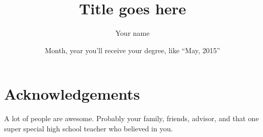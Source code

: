 \documentclass[letterpaper,11pt]{yalephd}
\title{Title goes here}
\author{Your name}
\date{Month, year you'll receive your degree, like ``May, 2015''} %
\begin{document}
\frontmatter

\begin{abstract}
\end{abstract}

\maketitle
\makecopyright{\printyear} %
\tableofcontents
\listoffigures %
\listoftables %


\chapter{Acknowledgements} %
A lot of people are awesome. Probably your family, friends, 
advisor, and that one super special high school teacher who
believed in you.

\mainmatter






\appendix





\backmatter


\end{document}

